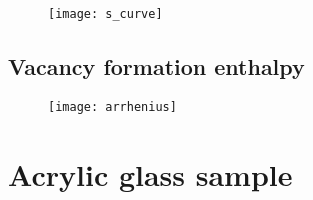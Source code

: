 \documentclass[11pt, english, fleqn, DIV=15, headinclude, BCOR=2cm]{scrreprt}
\begin{document}
\begin{figure}
    \centering
    \texttt{[image: s\_curve]}
    \caption{%
    }
    \label{fig:s_curve}
\end{figure}

\subsection{Vacancy formation enthalpy}

\begin{figure}
    \centering
    \texttt{[image: arrhenius]}
    \caption{%
    }
    \label{fig:arrhenius}
\end{figure}

\section{Acrylic glass sample}
\end{document}
